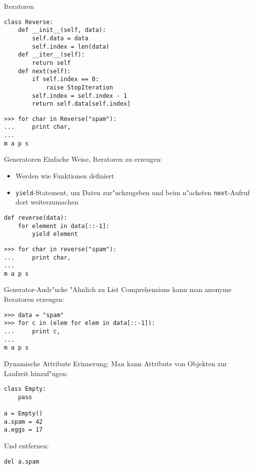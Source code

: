 \begin{frame}[fragile]{Iteratoren}
\begin{lstlisting}[style=Python]
class Reverse:
    def __init__(self, data):
        self.data = data
        self.index = len(data)
    def __iter__(self):
        return self
    def next(self):
        if self.index == 0:
            raise StopIteration
        self.index = self.index - 1
        return self.data[self.index]
\end{lstlisting}
\begin{lstlisting}[style=Shell]
>>> for char in Reverse("spam"):
...     print char,
...
m a p s
\end{lstlisting}
\end{frame}

\begin{frame}[fragile]{Generatoren}
Einfache Weise, Iteratoren zu erzeugen:
\begin{itemize}
\item Werden wie Funktionen definiert
\item \lstinline{yield}-Statement, um Daten zur"uckzugeben und beim n"achsten \lstinline{next}-Aufruf dort weiterzumachen
\end{itemize}
\begin{lstlisting}[style=Python]
def reverse(data):
    for element in data[::-1]:
        yield element
\end{lstlisting}
\begin{lstlisting}[style=Shell]
>>> for char in reverse("spam"):
...     print char,
...
m a p s
\end{lstlisting}
\end{frame}

\begin{frame}[fragile]{Generator-Audr"ucke}
"Ahnlich zu List Comprehensions kann man anonyme Iteratoren erzeugen:
\begin{lstlisting}[style=Shell]
>>> data = "spam"
>>> for c in (elem for elem in data[::-1]):
...     print c,
...
m a p s
\end{lstlisting}
\end{frame}


\begin{frame}[fragile]{Dynamische Attribute}
Erinnerung: Man kann Attribute von Objekten zur Laufzeit hinzuf"ugen:
\begin{lstlisting}
class Empty:
    pass

a = Empty()
a.spam = 42
a.eggs = 17
\end{lstlisting}
\vspace{2mm}
Und entfernen:
\begin{lstlisting}
del a.spam
\end{lstlisting}
\end{frame}

